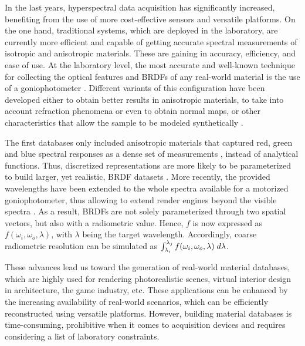In the last years, hyperspectral data acquisition has significantly increased, benefiting from the use of more cost-effective sensors and versatile platforms. On the one hand, traditional systems, which are deployed in the laboratory, are currently more efficient and capable of getting accurate spectral measurements of isotropic and anisotropic materials. These are gaining in accuracy, efficiency, and ease of use. At the laboratory level, the most accurate and well-known technique for collecting the optical features and BRDFs of any real-world material is the use of a goniophotometer \cite{riviere_multispectral_2012}. Different variants of this configuration have been developed either to obtain better results in anisotropic materials, to take into account refraction phenomena or even to obtain normal maps, or other characteristics that allow the sample to be modeled synthetically \cite{tunwattanapong_acquiring_2013, chen_reflectance_2014}. 

The first databases only included anisotropic materials that captured red, green and blue spectral responses as a dense set of measurements \cite{matusik_data-driven_2003}, instead of analytical functions. Thus, discretized representations are more likely to be parameterized to build larger, yet realistic, BRDF datasets \cite{serrano_intuitive_2016}. More recently, the provided wavelengths have been extended to the whole spectra available for a motorized goniophotometer, thus allowing to extend render engines beyond the visible spectra \cite{dupuy_adaptive_2018}. As a result, BRDFs are not solely parameterized through two spatial vectors, but also with a radiometric value. Hence, $f$ is now expressed as $f(\omega_i, \omega_o, \lambda)$, with $\lambda$ being the target wavelength. Accordingly, coarse radiometric resolution can be simulated as $\int_{\lambda_i}^{\lambda_j} f(\omega_i, \omega_o, \lambda) \hspace{1mm} d\lambda$. 

These advances lead us toward the generation of real-world material databases, which are highly used for rendering photorealistic scenes, virtual interior design in architecture, the game industry, etc. These applications can be enhanced by the increasing availability of real-world scenarios, which can be efficiently reconstructed using versatile platforms. However, building material databases is time-consuming, prohibitive when it comes to acquisition devices and requires considering a list of laboratory constraints. 

